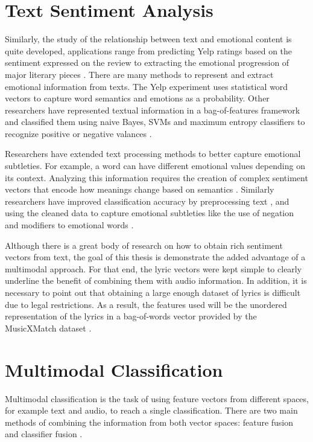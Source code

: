 \section*{Text Sentiment Analysis}

Similarly, the study of the relationship between text and emotional content is quite 
developed, applications range from predicting Yelp ratings based on the sentiment expressed on the 
review \cite{YelpReview}  to extracting the emotional progression of major literary pieces \cite{transprose}.  
There are many methods to represent and extract emotional information from texts. 
The Yelp experiment uses statistical word vectors to capture word semantics and 
emotions as a probability.  Other researchers have represented textual information in 
a bag-of-features framework and classified them using naive Bayes, SVMs and 
maximum entropy classifiers to recognize positive or negative valances \cite{Pang:2002:TUS:1118693.1118704}.  

Researchers have extended text processing methods to better capture emotional subtleties. For example, a word can have 
different emotional values depending on its context.  Analyzing this information requires the creation of complex sentiment vectors 
that encode how meanings change based on semantics \cite{Maas:2011:LWV:2002472.2002491}.  Similarly researchers 
have improved classification accuracy by preprocessing text \cite{Haddi201326}, and using the 
cleaned data to capture emotional subtleties like the use of negation and modifiers 
to emotional words \cite{Xia_sentimentvector}. 

Although there is a great body of research on how to obtain rich sentiment vectors 
from text, the goal of this thesis is demonstrate the added advantage of a 
multimodal approach.  For that end, the lyric vectors were kept simple to clearly
underline the benefit of combining them with audio information.  In addition, it is necessary 
to point out that obtaining a large enough dataset of lyrics is difficult due to legal restrictions.   
As a result, the features used will be the unordered representation of the lyrics in 
a bag-of-words vector provided by the MusicXMatch dataset \cite{musicXmatchDataset}.

\section*{Multimodal Classification}

Multimodal classification is the task of using feature vectors from different spaces, 
for example text and audio, to reach a single classification. There are two main 
methods of combining the information from both vector spaces: feature fusion and 
classifier fusion \cite{zhonga2012music}. 

